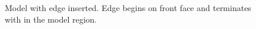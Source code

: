 \documentclass[a4paper, 12pt]{article}
\begin{document}
\begin{figure}[H]
  \centering
  \caption{Model with edge inserted. 
      Edge begins on front face and terminates 
        with in the model region.}
  \label{fig:edge3model}
\end{figure}
\end{document}
